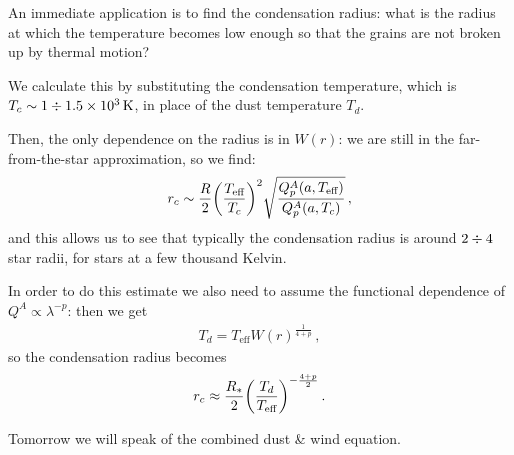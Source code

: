 \documentclass[main.tex]{subfiles}
\begin{document}
An immediate application is to find the condensation radius: what is the radius at which the temperature becomes low enough so that the grains are not broken up by thermal motion? 

We calculate this by substituting the condensation temperature, which is \(T_c \sim 1 \divisionsymbol  \SI{1.5e3}{K} \), in place of the dust temperature \(T_d\).

Then, the only dependence on the radius is in \(W(r)\): we are still in the far-from-the-star approximation, so we find:
%
\begin{align}
r_c \sim \frac{R}{2} \qty(\frac{T _{\text{eff}}}{T_c})^2
\sqrt{\frac{Q^{A}_p (a, T _{\text{eff}})}{Q^{A}_p (a,  T_c)}}
\,,
\end{align}
%
and this allows us to see that typically the condensation radius is around \(2 \divisionsymbol 4\) star radii, for stars at a few thousand Kelvin.

In order to do this estimate we also need to assume the functional dependence of \(Q^{A} \propto \lambda^{-p}\): then we get 
%
\begin{align}
T_d = T _{\text{eff}} W(r)^{\frac{1}{4+p}}
\,,
\end{align}
%
so the condensation radius becomes 
%
\begin{align}
r_c \approx \frac{R_*}{2} \qty(\frac{T_d}{T _{\text{eff}}})^{- \frac{4 + p}{2}}
\,.
\end{align}

Tomorrow we will speak of the combined dust \& wind equation. 
\end{document}
